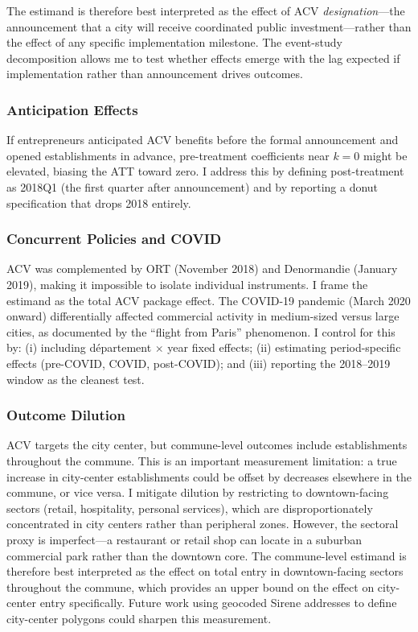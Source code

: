 \documentclass[12pt]{article}
\begin{document}
The estimand is therefore best interpreted as the effect of ACV \textit{designation}---the announcement that a city will receive coordinated public investment---rather than the effect of any specific implementation milestone. The event-study decomposition allows me to test whether effects emerge with the lag expected if implementation rather than announcement drives outcomes.

\subsubsection{Anticipation Effects}

If entrepreneurs anticipated ACV benefits before the formal announcement and opened establishments in advance, pre-treatment coefficients near $k = 0$ might be elevated, biasing the ATT toward zero. I address this by defining post-treatment as 2018Q1 (the first quarter after announcement) and by reporting a donut specification that drops 2018 entirely.

\subsubsection{Concurrent Policies and COVID}

ACV was complemented by ORT (November 2018) and Denormandie (January 2019), making it impossible to isolate individual instruments. I frame the estimand as the total ACV package effect. The COVID-19 pandemic (March 2020 onward) differentially affected commercial activity in medium-sized versus large cities, as documented by the ``flight from Paris'' phenomenon. I control for this by: (i) including d\'epartement $\times$ year fixed effects; (ii) estimating period-specific effects (pre-COVID, COVID, post-COVID); and (iii) reporting the 2018--2019 window as the cleanest test.

\subsubsection{Outcome Dilution}

ACV targets the city center, but commune-level outcomes include establishments throughout the commune. This is an important measurement limitation: a true increase in city-center establishments could be offset by decreases elsewhere in the commune, or vice versa. I mitigate dilution by restricting to downtown-facing sectors (retail, hospitality, personal services), which are disproportionately concentrated in city centers rather than peripheral zones. However, the sectoral proxy is imperfect---a restaurant or retail shop can locate in a suburban commercial park rather than the downtown core. The commune-level estimand is therefore best interpreted as the effect on total entry in downtown-facing sectors throughout the commune, which provides an upper bound on the effect on city-center entry specifically. Future work using geocoded Sirene addresses to define city-center polygons could sharpen this measurement.
\end{document}
